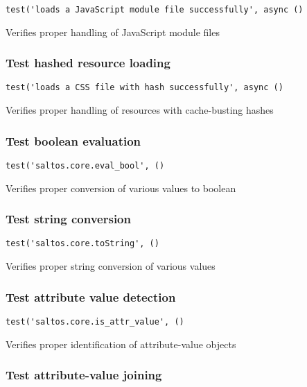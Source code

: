 \documentclass[a4paper]{article}
\begin{document}
\begin{lstlisting}
test('loads a JavaScript module file successfully', async ()
\end{lstlisting}

Verifies proper handling of JavaScript module files

\hypertarget{toc92}{}
\subsubsection{Test hashed resource loading}

\begin{lstlisting}
test('loads a CSS file with hash successfully', async ()
\end{lstlisting}

Verifies proper handling of resources with cache-busting hashes

\hypertarget{toc93}{}
\subsubsection{Test boolean evaluation}

\begin{lstlisting}
test('saltos.core.eval_bool', ()
\end{lstlisting}

Verifies proper conversion of various values to boolean

\hypertarget{toc94}{}
\subsubsection{Test string conversion}

\begin{lstlisting}
test('saltos.core.toString', ()
\end{lstlisting}

Verifies proper string conversion of various values

\hypertarget{toc95}{}
\subsubsection{Test attribute value detection}

\begin{lstlisting}
test('saltos.core.is_attr_value', ()
\end{lstlisting}

Verifies proper identification of attribute-value objects

\hypertarget{toc96}{}
\subsubsection{Test attribute-value joining}
\end{document}
